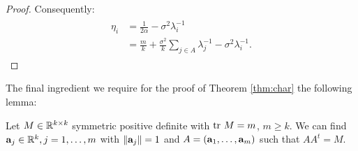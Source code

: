 \begin{proof}
  Consequently:
  \begin{align} \label{eq:etas}
    \begin{split}
      \eta_i &= \frac{1}{2\alpha} - \sigma^2 \lambda_i^{-1}\\
      &=\frac{m}{k} + \frac{\sigma^2}{k} \sum_{j\in A} \lambda_j^{-1} - \sigma^2 \lambda_i^{-1}.%
    \end{split}
  \end{align}
\end{proof}

The final ingredient we require for the proof of Theorem
\ref{thm:char} the following lemma:


\begin{lemma}\label{lemma:free}
  Let $M \in \mathbb{R}^{k \times k}$ symmetric positive definite with $\textup{tr}\ M
  = m$, $m \geq k$. We can find $\mathbf{a}_j \in \mathbb{R}^k,j=1,\dots,m$
  with $\|\mathbf{a}_j\|=1$ and $A = (\mathbf{a}_1,\dots,\mathbf{a}_m)$ such that
  $AA^t = M$.
\end{lemma}

